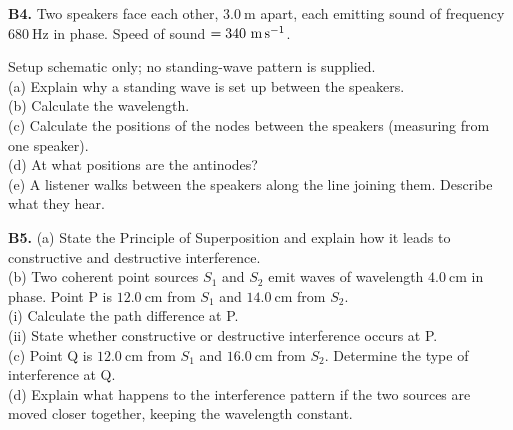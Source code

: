 \begin{exercisebox}[17]
\textbf{B4.} Two speakers face each other, $3.0\ \text{m}$
apart, each emitting sound of frequency
$680\ \text{Hz}$ in phase. Speed of sound
$= 340\ \text{m\,s}^{-1}$.\\[4pt]
\begin{center}
\end{center}
\small Setup schematic only; no standing-wave pattern is supplied.\\[4pt]
(a) Explain why a standing wave is set up between
the speakers.\\
(b) Calculate the wavelength.\\
(c) Calculate the positions of the nodes between
the speakers (measuring from one speaker).\\
(d) At what positions are the antinodes?\\
(e) A listener walks between the speakers along the
line joining them. Describe what they hear.
\hfill{}

\vspace{0.4cm}

\textbf{B5.} (a) State the Principle of Superposition
and explain how it leads to constructive and
destructive interference.\\[4pt]
(b) Two coherent point sources $S_1$ and $S_2$ emit
waves of wavelength $4.0\ \text{cm}$ in phase.
Point P is $12.0\ \text{cm}$ from $S_1$ and
$14.0\ \text{cm}$ from $S_2$.\\
(i) Calculate the path difference at P.\\
(ii) State whether constructive or destructive
interference occurs at P.\\[4pt]
(c) Point Q is $12.0\ \text{cm}$ from $S_1$ and
$16.0\ \text{cm}$ from $S_2$.
Determine the type of interference at Q.\\[4pt]
(d) Explain what happens to the interference
pattern if the two sources are moved closer
together, keeping the wavelength constant.
\hfill{}

\end{exercisebox}
